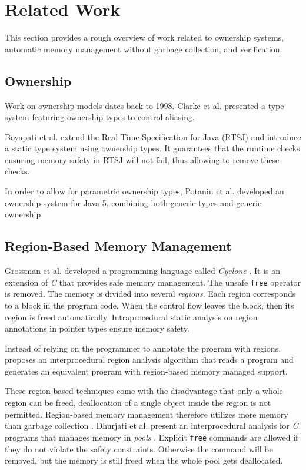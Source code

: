 \section{Related Work}\label{section:background-related}

This section provides a rough overview of work related to ownership systems, automatic memory management without garbage collection, and verification.

\subsection{Ownership}
Work on ownership models dates back to 1998.
Clarke et al. \cite{Clarke:1998:OTF:286936.286947} presented a type system featuring ownership types to control aliasing.

Boyapati et al. \cite{Boyapati:2003:OTS:781131.781168} extend the Real-Time Specification for Java (RTSJ) and introduce a static type system using ownership types.
It guarantees that the runtime checks ensuring memory safety in RTSJ will not fail, thus allowing to remove these checks.

In order to allow for parametric ownership types, Potanin et al. \cite{Potanin:2006:GOG:1167473.1167500} developed an ownership system for Java 5, combining both generic types and generic ownership.


\subsection{Region-Based Memory Management}
Grossman et al. developed a programming language called \emph{Cyclone} \cite{cyclone2002}.
It is an extension of \emph{C} that provides safe memory management.
The unsafe \texttt{free} operator is removed.
The memory is divided into several \emph{regions}.
Each region corresponds to a block in the program code.
When the control flow leaves the block, then its region is freed automatically.
Intraprocedural static analysis on region annotations in pointer types ensure memory safety.

Instead of relying on the programmer to annotate the program with regions, \cite{RegionJava} proposes an interprocedural region analysis algorithm that reads a \java program and generates an equivalent program with region-based memory managed support.

These region-based techniques come with the disadvantage that only a whole region can be freed, deallocation of a single object inside the region is not permitted.
Region-based memory management therefore utilizes more memory than garbage collection \cite{RegionJava,PoolAllocation}.
Dhurjati et al. present an interprocedural analysis for \emph{C} programs that manages memory in \emph{pools} \cite{PoolAllocation}.
Explicit \texttt{free} commands are allowed if they do not violate the safety constraints.
Otherwise the command will be removed, but the memory is still freed when the whole pool gets deallocated.


